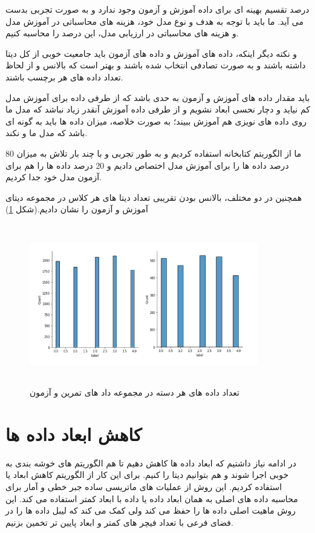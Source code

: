 \documentclass[12pt,onecolumn,a4paper]{article}
\begin{document}
درصد تقسیم بهینه ای برای داده آموزش و آزمون وجود ندارد و به صورت تجربی بدست می آید.
ما باید با توجه به هدف و نوع مدل خود، هزینه های محاسباتی در آموزش مدل و هزینه های محاسباتی در ارزیابی مدل، این درصد را محاسبه کنیم.

و نکته دیگر اینکه، داده های آموزش و داده های آزمون باید جامعیت خوبی از کل دیتا داشته باشند و به صورت تصادفی انتخاب شده باشند و بهتر است که بالانس و  از لحاظ تعداد داده های هر برچسب باشند.

باید مقدار داده های آموزش و آزمون به حدی باشد که از طرفی داده برای آموزش مدل کم نیاید و دچار نحسی ابعاد نشویم و از طرفی داده آموزش آنقدر زیاد نباشد که مدل ما روی داده های نویزی هم آموزش ببیند؛ به صورت خلاصه، میزان داده ها باید به گونه ای باشد که مدل ما  و  نکند.

ما از الگوریتم  کتابخانه  استفاده کردیم و به طور تجربی و با چند بار تلاش به میزان 80 درصد داده ها را برای آموزش مدل اختصاص دادیم و 20 درصد داده ها را هم برای آزمون مدل خود جدا کردیم.

همچنین در دو  مختلف، بالانس بودن تقریبی تعداد دیتا های هر کلاس در مجموعه دیتای آموزش و آزمون را نشان دادیم.(شکل \ref{fig:TestTrain})

\begin{figure}
  \centering
  \includegraphics[width=10cm,height=7cm,keepaspectratio]{7.png}
  \caption{تعداد داده های هر دسته در مجموعه داد های تمرین و آزمون}
  \label{fig:TestTrain}
\end{figure}

\section {کاهش ابعاد داده ها}
در ادامه نیاز داشتیم که ابعاد داده ها کاهش دهیم تا هم الگوریتم های خوشه بندی به خوبی اجرا شوند و هم بتوانیم دیتا را  کنیم. برای این کار از الگوریتم کاهش ابعاد  یا   استفاده کردیم. این روش از عملیات های ماتریسی ساده جبر خطی و آمار برای محاسبه  داده های اصلی به همان ابعاد داده یا داده با ابعاد کمتر استفاده می کند. این روش ماهیت اصلی داده ها را حفظ می کند ولی کمک می کند که لیبل داده ها را در فضای فرعی با تعداد فیچر های کمتر و ابعاد پایین تر تخمین بزنیم.
\end{document}

